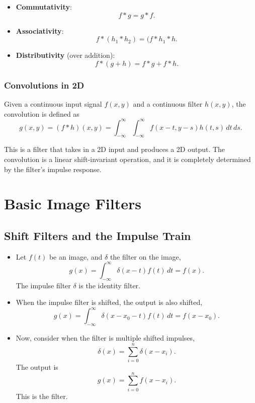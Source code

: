 \begin{itemize}
    \item \textbf{Commutativity}: \[ f \ast g = g \ast f. \]

    \item \textbf{Associativity}: \[ f \ast (h_1 \ast h_2) = (f \ast h_1 \ast h. \]

    \item \textbf{Distributivity} (over addition): \[ f \ast (g + h) = f \ast g + f \ast h. \]
\end{itemize}

\subsubsection{Convolutions in 2D}

Given a continuous input signal $f(x, y)$ and a continuous filter $h(x, y)$, the convolution is defined as \[
    g(x, y) = (f \ast h)(x, y) = \int_{-\infty}^{\infty} \int_{-\infty}^{\infty} f(x - t, y - s) h(t, s) \, dt \, ds.
\]

This is a filter that takes in a 2D input and produces a 2D output. The convolution is a linear shift-invariant operation, and it is completely determined by the filter's impulse response.

\section{Basic Image Filters}

\subsection{Shift Filters and the Impulse Train}

\begin{itemize}
    \item Let $f(t)$ be an image, and $\delta$ the filter on the image, \[
              g(x) = \int_{-\infty}^{\infty} \delta(x - t) f(t) \, dt = f(x).
          \] The impulse filter $\delta$ is the identity filter.

    \item When the impulse filter is shifted, the output is also shifted, \[ g(x) = \int_{-\infty}^{\infty} \delta(x - x_0 - t) f(t) \, dt = f(x - x_0). \]

    \item Now, consider when the filter is multiple shifted impulses, \[
              \delta(x) = \sum_{i = 0}^{n} \delta(x - x_i).
          \] The output is \[
              g(x) = \sum_{i = 0}^{n} f(x - x_i).
          \] This is the  filter.
\end{itemize}

